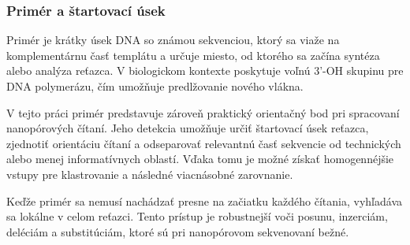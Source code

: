 \subsubsection{Primér a štartovací úsek}
Primér je krátky úsek DNA so známou sekvenciou, ktorý sa viaže na komplementárnu časť templátu a určuje miesto, od ktorého sa začína syntéza alebo analýza reťazca.
V biologickom kontexte poskytuje voľnú 3'-OH skupinu pre DNA polymerázu, čím umožňuje predlžovanie nového vlákna.

V tejto práci primér predstavuje zároveň praktický orientačný bod pri spracovaní nanopórových čítaní.
Jeho detekcia umožňuje určiť štartovací úsek reťazca, zjednotiť orientáciu čítaní a odseparovať relevantnú časť sekvencie od technických alebo menej informatívnych oblastí.
Vďaka tomu je možné získať homogennéjšie vstupy pre klastrovanie a následné viacnásobné zarovnanie.

Keďže primér sa nemusí nachádzať presne na začiatku každého čítania, vyhľadáva sa lokálne v celom reťazci.
Tento prístup je robustnejší voči posunu, inzerciám, deléciám a substitúciám, ktoré sú pri nanopórovom sekvenovaní bežné.
